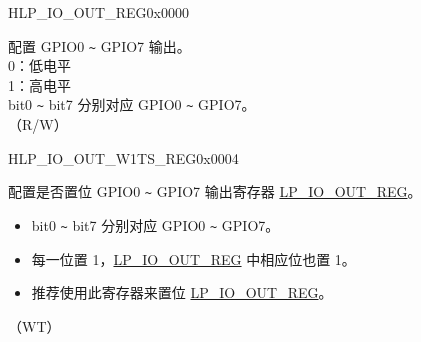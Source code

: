 \begin{register}{H}{LP\_IO\_OUT\_REG}{0x0000}\label{regdesc:LPIOOUTREG}
%
%
\regnewline%
\begin{regdesc}\begin{reglist}
\label{fielddesc:LPIOOUTDATA}\item [LP\_GPIO\_OUT\_DATA] 配置 GPIO0 \verb+~+ GPIO7 输出。\\
0：低电平\\
1：高电平\\
bit0 \verb+~+ bit7 分别对应 GPIO0 \verb+~+ GPIO7。\\（R/W）
\end{reglist}\end{regdesc}
\end{register}


\begin{register}{H}{LP\_IO\_OUT\_W1TS\_REG}{0x0004}\label{regdesc:LPIOOUTW1TSREG}
%
%
\regnewline%
\begin{regdesc}\begin{reglist}
\label{fielddesc:LPIOOUTDATAW1TS}\item [LP\_GPIO\_OUT\_DATA\_W1TS] 配置是否置位 GPIO0 \verb+~+ GPIO7 输出寄存器 \hyperref[regdesc:LPIOOUTREG]{LP\_IO\_OUT\_REG}。\\
\begin{itemize}
    \item bit0 \verb+~+ bit7 分别对应 GPIO0 \verb+~+ GPIO7。
    \item 每一位置 1，\hyperref[regdesc:LPIOOUTREG]{LP\_IO\_OUT\_REG} 中相应位也置 1。
    \item 推荐使用此寄存器来置位 \hyperref[regdesc:LPIOOUTREG]{LP\_IO\_OUT\_REG}。\end{itemize}（WT）
\end{reglist}\end{regdesc}
\end{register}


